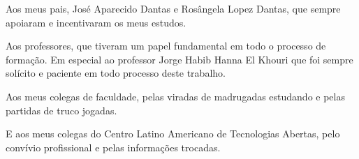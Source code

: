 
\begin{agradecimentos}
Aos meus pais, José Aparecido Dantas e Rosângela Lopez Dantas, que sempre apoiaram e incentivaram os meus
estudos.

Aos professores, que tiveram um papel fundamental em todo o processo de formação. Em especial ao professor
Jorge Habib Hanna El Khouri que foi sempre solícito e paciente em todo processo deste trabalho.

Aos meus colegas de faculdade, pelas viradas de madrugadas estudando e pelas partidas de truco jogadas.

E aos meus colegas do Centro Latino Americano de Tecnologias Abertas, pelo convívio profissional e pelas
informações trocadas.
\end{agradecimentos}
